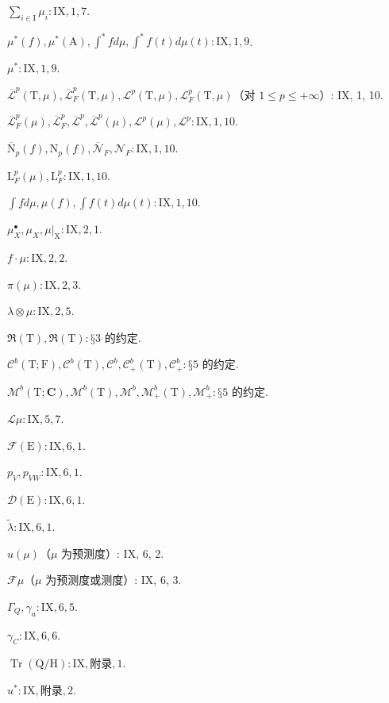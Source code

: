 \(\sum_{i \in \mathrm{I}} \mu_i: \mathrm{IX}, 1, 7\).

\(\mu^*(f), \mu^*(\mathrm{A}), \int^* f d\mu, \int^* f(t) d\mu(t): \mathrm{IX}, 1, 9\).

\(\mu^*: \mathrm{IX}, 1, 9\).

\(\overline{\mathcal{L}}^p(\mathrm{T}, \mu), \overline{\mathcal{L}}_F^p(\mathrm{T}, \mu), \mathcal{L}^p(\mathrm{T}, \mu), \mathcal{L}_F^p(\mathrm{T}, \mu)\)（对 \(1 \leqslant p \leqslant +\infty\)）: IX, 1, 10.

\(\overline{\mathcal{L}}_F^p(\mu), \overline{\mathcal{L}}_F^p, \overline{\mathcal{L}}^p, \overline{\mathcal{L}}^p(\mu), \mathcal{L}^p(\mu), \mathcal{L}^p: \mathrm{IX}, 1, 10\).

\(\overline{\mathrm{N}}_p(f), \mathrm{N}_p(f), \overline{\mathcal{N}}_F, \mathcal{N}_F: \mathrm{IX}, 1, 10\).

\(\mathrm{L}_F^p(\mu), \mathrm{L}_F^p: \mathrm{IX}, 1, 10\).

\(\int f d\mu, \mu(f), \int f(t) d\mu(t): \mathrm{IX}, 1, 10\).

\(\mu_X^\bullet, \mu_X, \mu|_{\mathrm{X}}: \mathrm{IX}, 2, 1\).

\(f \cdot \mu: \mathrm{IX}, 2, 2\).

\(\pi(\mu): \mathrm{IX}, 2, 3\).

\(\lambda \otimes \mu: \mathrm{IX}, 2, 5\).

\(\Re(\mathrm{T}), \Re(\mathrm{T}): \text{§3 的约定}\).

\(\mathcal{C}^b(\mathrm{T}; \mathrm{F}), \mathcal{C}^b(\mathrm{T}), \mathcal{C}^b, \mathcal{C}_+^b(\mathrm{T}), \mathcal{C}_+^b: \text{§5 的约定}\).

\(\mathcal{M}^b(\mathrm{T}; \mathbf{C}), \mathcal{M}^b(\mathrm{T}), \mathcal{M}^b, \mathcal{M}_+^b(\mathrm{T}), \mathcal{M}_+^b: \text{§5 的约定}\).

\(\mathcal{L}\mu: \mathrm{IX}, 5, 7\).

\(\mathcal{F}(\mathrm{E}): \mathrm{IX}, 6, 1\).

\(p_V, p_{VW}: \mathrm{IX}, 6, 1\).

\(\mathcal{D}(\mathrm{E}): \mathrm{IX}, 6, 1\).

\(\widetilde{\lambda}: \mathrm{IX}, 6, 1\).

\(u(\mu)\)（\(\mu\) 为预测度）: IX, 6, 2.

\(\mathcal{F}\mu\)（\(\mu\) 为预测度或测度）: IX, 6, 3.

\(\Gamma_Q, \gamma_a: \mathrm{IX}, 6, 5\).

\(\gamma_C: \mathrm{IX}, 6, 6\).

\(\operatorname{Tr}(\mathrm{Q}/\mathrm{H}): \mathrm{IX}, \text{附录}, 1\).

\(u^*: \mathrm{IX}, \text{附录}, 2\).
